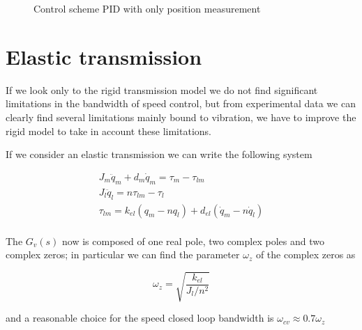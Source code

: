 \begin{figure}
\centering
{}
\caption{Control scheme PID with only position measurement}
\label{fig:rigid_control_position_only_pid}
\end{figure}

\section{Elastic transmission}

If we look only to the rigid transmission model we do not find significant limitations in the bandwidth of speed control, but from experimental data we can clearly find several limitations mainly bound to vibration, we have to improve the rigid model to take in account these limitations.

If we consider an elastic transmission we can write the following system

\begin{gather*}
    J_m\ddot{q}_m + d_m \dot{q}_m = \tau_m - \tau_{lm}\\
    J_l\ddot{q}_l = n \tau_{lm} - \tau_l\\
    \tau_{lm} = k_{el}(q_m - n q_l) + d_{el}(\dot{q}_m - n \dot{q}_l)\\
\end{gather*}

The $G_v(s)$ now is composed of one real pole, two complex poles and two complex zeros;
in particular we can find the parameter $\omega_z$ of the complex zeros as

\[\omega_z = \sqrt{\frac{k_{el}}{J_l/n^2}}\]

and a reasonable choice for the speed closed loop bandwidth is $\omega_{cv} \approx 0.7 \omega_z$
